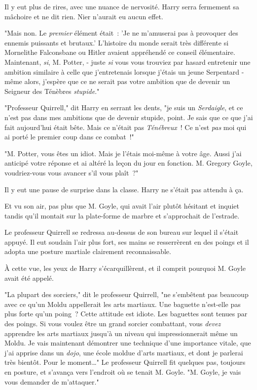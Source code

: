 Il y eut plus de rires, avec une nuance de nervosité. Harry serra fermement sa mâchoire et ne dit rien. Nier n'aurait eu aucun effet.

"Mais non. Le \emph{premier} élément était~: 'Je ne m'amuserai pas à provoquer des ennemis puissants et brutaux.' L'histoire du monde serait très différente si Mornelithe Falconsbane ou Hitler avaient appréhendé ce conseil élémentaire. Maintenant, \emph{si}, M. Potter, - juste \emph{si} vous vous trouviez par hasard entretenir une ambition similaire à celle que j'entretenais lorsque j'étais un jeune Serpentard - même alors, j'espère que ce ne serait pas votre ambition que de devenir un Seigneur des Ténèbres \emph{stupide}."

"Professeur Quirrell," dit Harry en serrant les dents, "je suis un \emph{Serdaigle}, et ce n'est pas dans mes ambitions que de devenir stupide, point. Je sais que ce que j'ai fait aujourd'hui était bête. Mais ce n'était pas \emph{Ténébreux}~! Ce n'est \emph{pas} moi qui ai porté le premier coup dans ce combat~!"

"M. Potter, vous êtes un idiot. Mais je l'étais moi-même à votre âge. Aussi j'ai anticipé votre réponse et ai altéré la leçon du jour en fonction. M. Gregory Goyle, voudriez-vous vous avancer s'il vous plaît~?"

Il y eut une pause de surprise dans la classe. Harry ne s'était pas attendu à ça.

Et vu son air, pas plus que M. Goyle, qui avait l'air plutôt hésitant et inquiet tandis qu'il montait sur la plate-forme de marbre et s'approchait de l'estrade.

Le professeur Quirrell se redressa au-dessus de son bureau sur lequel il s'était appuyé. Il eut soudain l'air plus fort, ses mains se resserrèrent en des poings et il adopta une posture martiale clairement reconnaissable.

À cette vue, les yeux de Harry s'écarquillèrent, et il comprit pourquoi M. Goyle avait été appelé.

"La plupart des sorciers," dit le professeur Quirrell, "ne s'embêtent pas beaucoup avec ce qu'un Moldu appellerait les arts martiaux. Une baguette n'est-elle pas plus forte qu'un poing~? Cette attitude est idiote. Les baguettes sont tenues par des poings. Si vous voulez être un grand sorcier combattant, vous \emph{devez} apprendre les arts martiaux jusqu'à un niveau qui impressionnerait même un Moldu. Je vais maintenant démontrer une technique d'une importance vitale, que j'ai apprise dans un \emph{dojo}, une école moldue d'arts martiaux, et dont je parlerai très bientôt. Pour le moment…" Le professeur Quirrell fit quelques pas, toujours en posture, et s'avança vers l'endroit où se tenait M. Goyle. "M. Goyle, je vais vous demander de m'attaquer."

